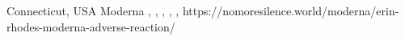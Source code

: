           {Connecticut, USA}
          {}
          {Moderna}
          {, }
          {
            ,
            ,
            ,
            ,
          }
          {https://nomoresilence.world/moderna/erin-rhodes-moderna-adverse-reaction/}



